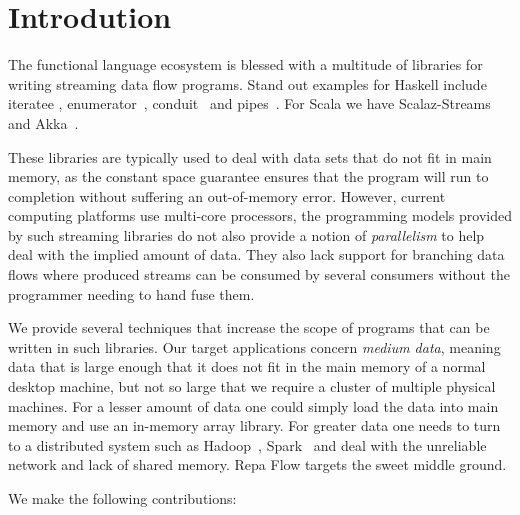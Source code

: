 \section{Introdution}

The functional language ecosystem is blessed with a multitude of libraries for writing streaming data flow programs. Stand out examples for Haskell include iteratee \cite{Kiselyov:iteratee}, enumerator~\cite{hackage:enumerator}, conduit~\cite{hackage:conduit} and pipes~\cite{hackage:pipes}. For Scala we have Scalaz-Streams~\cite{github:scalaz-streams} and Akka~\cite{github:akka}.

These libraries are typically used to deal with data sets that do not fit in main memory, as the constant space guarantee ensures that the program will run to completion without suffering an out-of-memory error. However, current computing platforms use multi-core processors, the programming models provided by such streaming libraries do not also provide a notion of \emph{parallelism} to help deal with the implied amount of data. They also lack support for branching data flows where produced streams can be consumed by several consumers without the programmer needing to hand fuse them.

We provide several techniques that increase the scope of programs that can be written in such libraries. Our target applications concern \emph{medium data}, meaning data that is large enough that it does not fit in the main memory of a normal desktop machine, but not so large that we require a cluster of multiple physical machines. For a lesser amount of data one could simply load the data into main memory and use an in-memory array library. For greater data one needs to turn to a distributed system such as Hadoop~\cite{Shvachko:Hadoop}, Spark~\cite{Zaharia:RDDs} and deal with the unreliable network and lack of shared memory. Repa Flow targets the sweet middle ground.

\eject
We make the following contributions:

